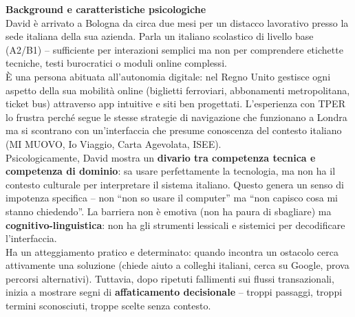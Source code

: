 \documentclass[11pt,a4paper]{article}
\begin{document}
\begin{tcolorbox}[colback=backgroundColor,colframe=borderColor,arc=2mm]
    \textbf{Background e caratteristiche psicologiche} \\[4pt]
    {\small
    David \`e arrivato a Bologna da circa due mesi per un distacco lavorativo presso la sede italiana della sua azienda. Parla un italiano scolastico di livello base (A2/B1) -- sufficiente per interazioni semplici ma non per comprendere etichette tecniche, testi burocratici o moduli online complessi. \\[4pt]

    \`E una persona abituata all'autonomia digitale: nel Regno Unito gestisce ogni aspetto della sua mobilit\`a online (biglietti ferroviari, abbonamenti metropolitana, ticket bus) attraverso app intuitive e siti ben progettati. L'esperienza con TPER lo frustra perch\'e segue le stesse strategie di navigazione che funzionano a Londra ma si scontrano con un'interfaccia che presume conoscenza del contesto italiano (MI MUOVO, Io Viaggio, Carta Agevolata, ISEE). \\[4pt]

    Psicologicamente, David mostra un \textbf{divario tra competenza tecnica e competenza di dominio}: sa usare perfettamente la tecnologia, ma non ha il contesto culturale per interpretare il sistema italiano. Questo genera un senso di impotenza specifica -- non ``non so usare il computer'' ma ``non capisco cosa mi stanno chiedendo''. La barriera non \`e emotiva (non ha paura di sbagliare) ma \textbf{cognitivo-linguistica}: non ha gli strumenti lessicali e sistemici per decodificare l'interfaccia. \\[4pt]

    Ha un atteggiamento pratico e determinato: quando incontra un ostacolo cerca attivamente una soluzione (chiede aiuto a colleghi italiani, cerca su Google, prova percorsi alternativi). Tuttavia, dopo ripetuti fallimenti sui flussi transazionali, inizia a mostrare segni di \textbf{affaticamento decisionale} -- troppi passaggi, troppi termini sconosciuti, troppe scelte senza contesto.
    }
\end{tcolorbox}

\vspace{0.3cm}

\end{document}
